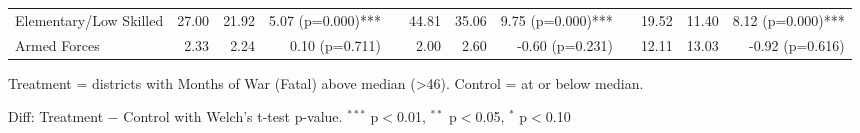 \begin{table}[htbp]
\begin{tabular}{l rrr c rrr c rrr}
\quad Elementary/Low Skilled & 27.00 & 21.92 & 5.07 (p=0.000)*** &  & 44.81 & 35.06 & 9.75 (p=0.000)*** &  & 19.52 & 11.40 & 8.12 (p=0.000)*** \\
\quad Armed Forces & 2.33 & 2.24 & 0.10 (p=0.711) &  & 2.00 & 2.60 & -0.60 (p=0.231) &  & 12.11 & 13.03 & -0.92 (p=0.616) \\
\bottomrule
\end{tabular}
\begin{tablenotes}
\small
\item Treatment = districts with Months of War (Fatal) above median (>46). Control = at or below median.
\item Diff: Treatment $-$ Control with Welch's t-test p-value. $^{{***}}$ p$<$0.01, $^{{**}}$ p$<$0.05, $^{{*}}$ p$<$0.10
\end{tablenotes}
\end{table}

\clearpage

